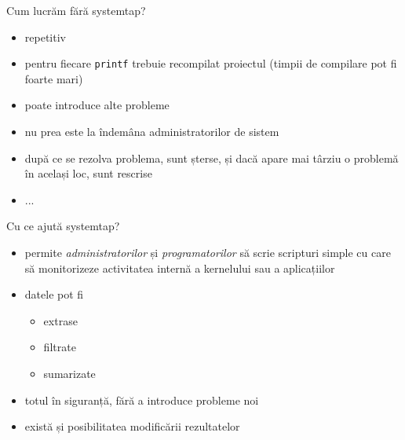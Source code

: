 \documentclass{beamer}
\begin{document}
\begin{frame}{Cum lucrăm fără systemtap?}
  \begin{itemize}
    \item repetitiv
    \item pentru fiecare \texttt{printf} trebuie recompilat proiectul
      (timpii de compilare pot fi foarte mari)
    \item poate introduce alte probleme
    \item nu prea este la îndemâna administratorilor de sistem
    \item după ce se rezolva problema, sunt șterse, și dacă apare mai
      târziu o problemă în același loc, sunt rescrise
    \item ...
  \end{itemize}
\end{frame}


\begin{frame}{Cu ce ajută systemtap?}
  \begin{itemize}
    \item permite \textit{administratorilor} și
      \textit{programatorilor} să scrie scripturi simple cu care să
      monitorizeze activitatea internă a kernelului sau a aplicațiilor
    \item datele pot fi
      \begin{itemize}
      \item extrase
      \item filtrate
      \item sumarizate
      \end{itemize}
    \item totul în siguranță, fără a introduce probleme noi
    \item \small există și posibilitatea modificării rezultatelor
  \end{itemize}
\end{frame}
\end{document}
